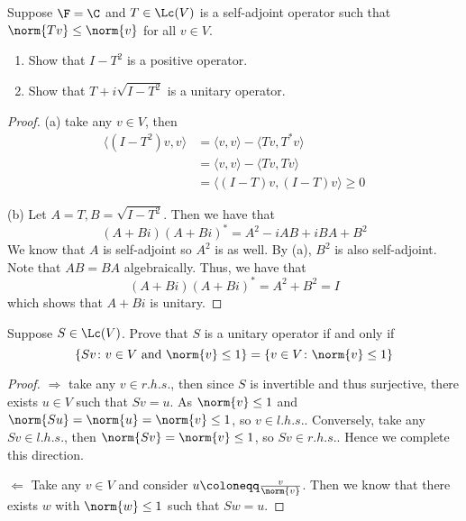 \documentclass{extarticle}
\begin{document}
\begin{problem}{10}
    Suppose \(\F = \C\) and \(T \in \Lc(V)\) is a self-adjoint operator such that
    \(\norm{Tv} \leq \norm{v}\) for all \(v \in V\).
    \begin{enumerate}[label=(\alph*)]
        \item Show that \(I - T^2\) is a positive operator.
        \item Show that \(T + i \sqrt{I - T^2}\) is a unitary operator.
    \end{enumerate}
\end{problem}

\begin{proof}
(a)  take any \(v \in V\), then
\begin{align*}
    \langle (I - T^2)v,v \rangle
    &= \langle v,v \rangle - \langle Tv,T^*v \rangle \\
    &= \langle v,v \rangle - \langle Tv,Tv \rangle \\
    &= \langle (I - T)v, (I - T)v \rangle \geq 0
\end{align*}

(b) Let \(A = T, B = \sqrt{I - T^2}\). Then we have that
\[(A+Bi)(A+Bi)^* = A^2 -iAB + iBA + B^2\]
We know that \(A\) is self-adjoint so \(A^2\) is as well. By (a), \(B^2\) is also
self-adjoint. Note that \(AB = BA\) algebraically. Thus, we have that
\[(A+Bi)(A+Bi)^* = A^2 + B^2 = I\]
which shows that \(A+Bi\) is unitary.
\end{proof}

\begin{problem}{11}
    Suppose \(S \in \Lc(V)\). Prove that \(S\) is a unitary operator if and only if
    \[\{Sv \colon v \in V \text{ and } \norm{v} \leq 1\} = \{v \in V \colon \norm{v} \leq 1\}\]
\end{problem}

\begin{proof}
\(\Rightarrow\) take any \(v \in r.h.s.\), then since \(S\) is invertible and thus surjective, there exists
\(u \in V\) such that \(Sv = u\). As \(\norm{v} \leq 1\) and \(\norm{Su} = \norm{u} = \norm{v} \leq 1\),
so \(v \in l.h.s.\). Conversely, take any \(Sv \in l.h.s.\), then \(\norm{Sv} = \norm{v} \leq 1\), so
\(Sv \in r.h.s.\). Hence we complete this direction.

\(\Leftarrow\) Take any \(v \in V\) and consider \(u \coloneqq \frac{v}{\norm{v}}\). Then we know that
there exists \(w\) with \(\norm{w} \leq 1\) such that \(Sw = u \).
\end{proof}
\end{document}
